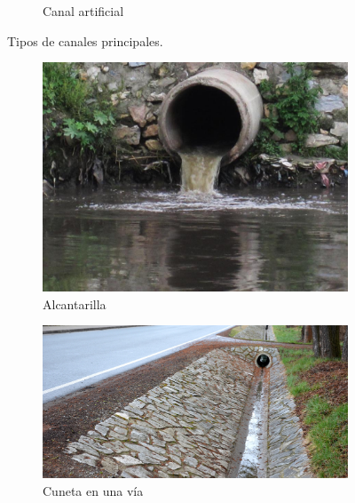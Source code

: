 \documentclass[11pt, oneside]{article}
\begin{document}
\begin{figure}
\begin{subfigure}[b]{0.48\textwidth}
         \caption{Canal artificial}
         \label{fig2b}
     \end{subfigure}
      \caption{Tipos de canales principales.}
\end{figure}

\begin{figure}
     \centering
     \begin{subfigure}[b]{0.32\textwidth}
         \centering
         \includegraphics[width=\textwidth]{fig21a}
         \caption{Alcantarilla}
         \label{fig21a}
     \end{subfigure}
     \hfill
     \begin{subfigure}[b]{0.32\textwidth}
         \centering
         \includegraphics[width=\textwidth]{fig21b}
         \caption{Cuneta en una v\'ia}
         \label{fig21b}
     \end{subfigure}
     \hfill
     \begin{subfigure}[b]{0.32\textwidth}
         \centering

\end{subfigure}
\end{figure}
\end{document}
